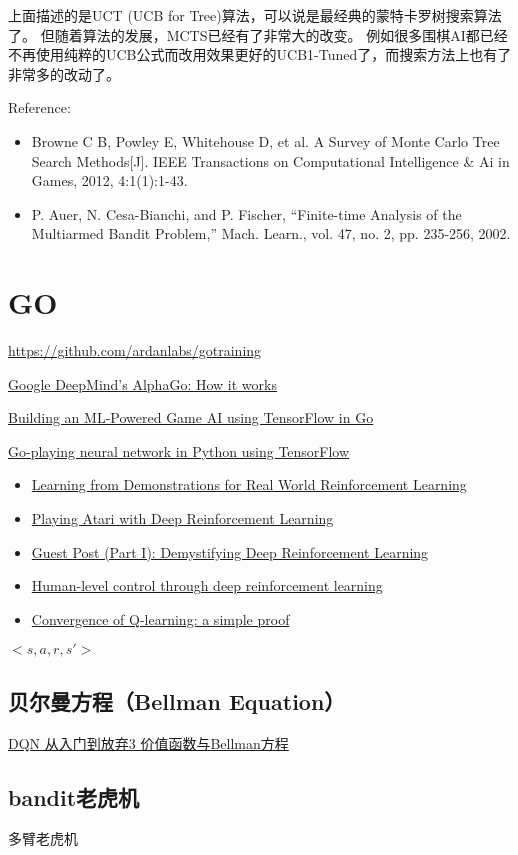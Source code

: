 \documentclass[10pt,a4paper]{ctexbook}
\begin{document}
上面描述的是UCT (UCB for Tree)算法，可以说是最经典的蒙特卡罗树搜索算法了。
但随着算法的发展，MCTS已经有了非常大的改变。
例如很多围棋AI都已经不再使用纯粹的UCB公式而改用效果更好的UCB1-Tuned了，而搜索方法上也有了非常多的改动了。

Reference:
\begin{itemize}
\item Browne C B, Powley E, Whitehouse D, et al. A Survey of Monte Carlo Tree Search Methods[J]. IEEE Transactions on Computational Intelligence \& Ai in Games, 2012, 4:1(1):1-43.
\item P. Auer, N. Cesa-Bianchi, and P. Fischer, “Finite-time Analysis  of the Multiarmed Bandit Problem,” Mach. Learn., vol. 47, no. 2,  pp. 235-256, 2002.
\end{itemize}

\section{GO}

\url{https://github.com/ardanlabs/gotraining}

\href{https://www.tastehit.com/blog/google-deepmind-alphago-how-it-works/}{Google DeepMind's AlphaGo: How it works}

\href{http://gopherdata.io/post/build_ml_powered_game_ai_tensorflow/}{Building an ML-Powered Game AI using TensorFlow in Go}

\href{https://github.com/TheDuck314/go-NN}{Go-playing neural network in Python using TensorFlow}

\begin{itemize}
\item \href{https://arxiv.org/pdf/1704.03732.pdf}{Learning from Demonstrations for Real World Reinforcement Learning}
\item \href{https://arxiv.org/abs/1312.5602}{Playing Atari with Deep Reinforcement Learning}
\item \href{https://www.intelnervana.com/demystifying-deep-reinforcement-learning/}{Guest Post (Part I): Demystifying Deep Reinforcement Learning}
\item \href{https://storage.googleapis.com/deepmind-media/dqn/DQNNaturePaper.pdf}{Human-level control through deep reinforcement learning}
\item \href{http://simplecore-dev.intel.com/nervana/wp-content/uploads/sites/55/2015/12/ProofQlearning.pdf}{Convergence of Q-learning: a simple proof}
\end{itemize}

$<s, a, r, s'>$

\subsection{贝尔曼方程（Bellman Equation）}
\href{https://zhuanlan.zhihu.com/p/21340755?refer=intelligentunit}{DQN 从入门到放弃3 价值函数与Bellman方程}

\subsection{bandit老虎机}
多臂老虎机




\ifx\mlbook\undefined
    
\end{document}

